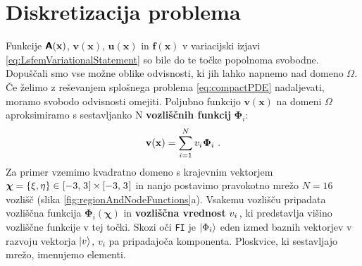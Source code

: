 \section{Diskretizacija problema}

Funkcije $\bm{\mathsf{A}}\mathbf{(x)}$, $\mathbf{v(x)}$, $\mathbf{u(x)}$ in $\mathbf{f(x)}$ v variacijski izjavi \eqref{eq:LsfemVariationalStatement} so bile do te točke popolnoma svobodne. Dopuščali smo vse možne oblike odvisnosti, ki jih lahko napnemo nad domeno $\Omega$. Če želimo z reševanjem splošnega problema \eqref{eq:compactPDE} nadaljevati, moramo svobodo odvisnosti omejiti. Poljubno funkcijo $\mathbf{v(x)}$ na domeni $\Omega$ aproksimiramo s sestavljanko N \textbf{vozliščnih funkcij} $\mathbf{\Phi}_i$:
\begin{equation}
    \mathbf{v(x)} = \sum_{i = 1}^N v_i  \mkern1mu \mathbf{\Phi}_i \ .
\end{equation}
Za primer vzemimo kvadratno domeno s krajevnim vektorjem $\bm{\chi} = \{\xi,\eta\} \in [-3,\mkern2mu 3\mkern1mu] \mkern-1mu \times \mkern-1mu [-3,\mkern2mu 3\mkern1mu]$ in nanjo postavimo pravokotno mrežo $N = 16$ vozlišč (slika \ref{fig:regionAndNodeFunctions}a). Vsakemu vozlišču pripadata vozliščna funkcija $\mathbf{\Phi}_i(\bm\chi)$ in \textbf{vozliščna vrednost} $v_i\mkern2mu$, ki predstavlja višino vozliščne funkcije v tej točki. Skozi oči \texttt{FI} je $\ket{\Phi_i}$ eden izmed baznih vektorjev v razvoju vektorja $\ket{v}$, $v_i$ pa pripadajoča komponenta. Ploskvice, ki sestavljajo mrežo, imenujemo elementi.

